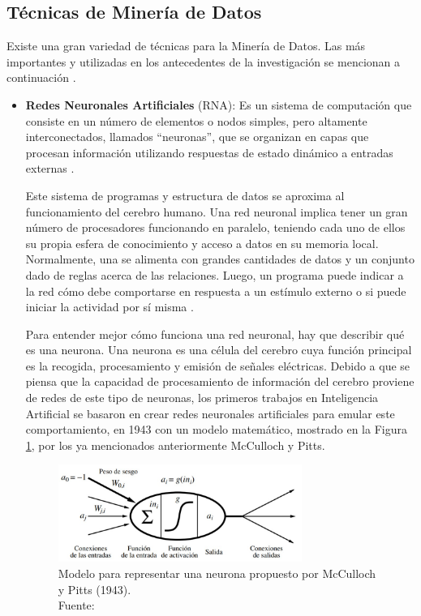 \clearpage

\subsection{Técnicas de Minería de Datos}

Existe una gran variedad de técnicas para la Minería de Datos. Las más importantes y utilizadas en los antecedentes de la investigación se mencionan a continuación \parencite{gl_microsoft2018datamining}.

\begin{itemize}
	\item \textbf{Redes Neuronales Artificiales} (RNA): Es un sistema de computación que consiste en un número de elementos o nodos simples, pero altamente interconectados, llamados “neuronas”, que se organizan en capas que procesan información utilizando respuestas de estado dinámico a entradas externas \parencite{tec_inzaugarat2018ann}.
	
	Este sistema de programas y estructura de datos se aproxima al funcionamiento del cerebro humano. Una red neuronal implica tener un gran número de procesadores funcionando en paralelo, teniendo cada uno de ellos su propia esfera de conocimiento y acceso a datos en su memoria local. Normalmente, una se alimenta con grandes cantidades de datos y un conjunto dado de reglas acerca de las relaciones. Luego, un programa puede indicar a la red cómo debe comportarse en respuesta a un estímulo externo o si puede iniciar la actividad por sí misma \parencite{tec_banafa2019deeplearning}.
	
	Para entender mejor cómo funciona una red neuronal, hay que describir qué es una neurona. Una neurona es una célula del cerebro cuya función principal es la recogida, procesamiento y emisión de señales eléctricas. Debido a que se piensa que la capacidad de procesamiento de información del cerebro proviene de redes de este tipo de neuronas, los primeros trabajos en Inteligencia Artificial se basaron en crear redes neuronales artificiales para emular este comportamiento, en 1943 con un modelo matemático, mostrado en la Figura \ref{2:fig10}, por los ya mencionados anteriormente McCulloch y Pitts.
	\begin{figure}[h]
		\begin{center}
			\includegraphics[width=0.75\textwidth]{2/figures/rnn_mcculloch.jpg}
			\caption[Modelo para representar una neurona propuesto por McCulloch y Pitts (1943)]{Modelo para representar una neurona propuesto por McCulloch y Pitts (1943).\\
			Fuente: \cite{bk_russell2004intart}}
			\label{2:fig10}
		\end{center}
	\end{figure}


\end{itemize}
